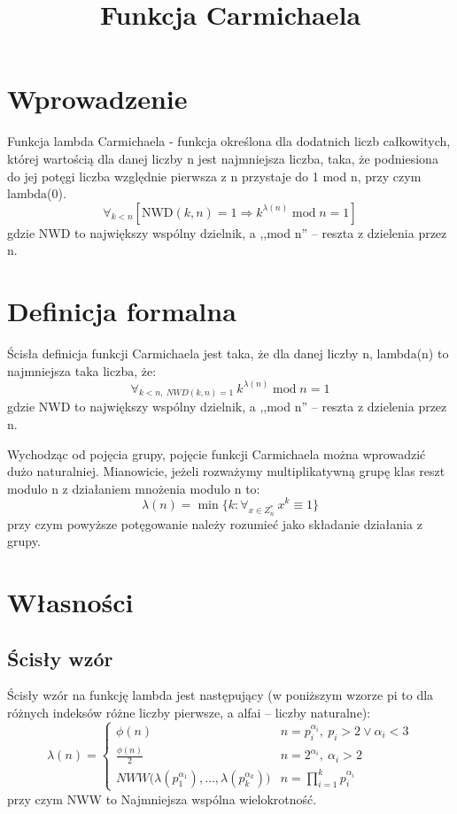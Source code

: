 \documentclass{article}
\begin{document}
\title{Funkcja Carmichaela}
\maketitle

\section*{Wprowadzenie}
Funkcja lambda Carmichaela - funkcja określona dla dodatnich liczb całkowitych, której wartością dla danej liczby n jest najmniejsza liczba, taka, że podniesiona do jej potęgi liczba względnie pierwsza z n przystaje do 1 mod n, przy czym lambda(0). 
$$ \forall _{k<n}\left[{\mbox{NWD}}(k,n)=1\Rightarrow k^{\lambda (n)}\operatorname {mod} n=1\right] $$
gdzie NWD to największy wspólny dzielnik, a ,,mod n'' – reszta z dzielenia przez n.

\section*{Definicja formalna}
Ścisła definicja funkcji Carmichaela jest taka, że dla danej liczby n, lambda(n) to najmniejsza taka liczba, że: 
\[ \forall _{k<n,\ NWD(k,n)=1}\ k^{\lambda (n)}\operatorname {mod} n=1 \]
gdzie NWD to największy wspólny dzielnik, a ,,mod n'' – reszta z dzielenia przez n.

Wychodząc od pojęcia grupy, pojęcie funkcji Carmichaela można wprowadzić dużo naturalniej. Mianowicie, jeżeli rozważymy multiplikatywną grupę klas reszt modulo n z działaniem mnożenia modulo n to: 
\begin{equation*}
\lambda (n)=\min\{k:\forall _{x\in Z_{n}^{*}}\ x^{k}\equiv 1\}
\end{equation*}
przy czym powyższe potęgowanie należy rozumieć jako składanie działania z grupy. 

\section*{Własności}
\subsection*{Ścisły wzór}
Ścisły wzór na funkcję lambda jest następujący (w poniższym wzorze pi to dla różnych indeksów różne liczby pierwsze, a alfai – liczby naturalne): 
\begin{displaymath}
\lambda (n)=\left\{{\begin{array}{cl}\phi (n)&n=p_{i}^{\alpha _{i}},\ p_{i}>2\lor \alpha _{i}<3\\{\frac {\phi (n)}{2}}&n=2^{\alpha _{i}},\ \alpha _{i}>2\\NWW{\big (}\lambda (p_{1}^{\alpha _{1}}),\dots ,\lambda (p_{k}^{\alpha _{k}}){\big )}&n=\prod _{i=1}^{k}p_{i}^{\alpha _{i}}\end{array}}\right.
\end{displaymath}
przy czym NWW to Najmniejsza wspólna wielokrotność. 
\end{document}
